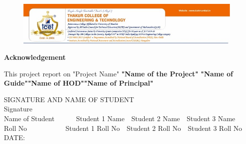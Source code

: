 \documentclass{book}
\begin{document}
\begin{figure}[h]
	\centering
	\includegraphics[scale=0.63]{tcet.jpg}
\end{figure}
\Huge
\textbf{Acknowledgement\\} 
\begin{doublespace}
	\Large
	This project report on "Project Name"  \textbf{"Name of the Project"} \textbf{"Name of Guide"}\textbf{"Name of HOD"}\textbf{"Name of Principal"}
\end{doublespace}
\tab\tab
\begin{doublespace}
	\normalsize
	\begin{flushleft}
		SIGNATURE AND NAME OF STUDENT\\

 Signature\\
 Name of Student \,\,\,\,\,\,\,\,\,\,\,\,\,\,\, Student 1 Name \,\, Student 2 Name \, \,Student 3 Name\\
 Roll No \,\,\,\,\,\,\,\,\,\,\,\,\,\,\,\,\,\,\,\,\,\,\,\,\,\,\,\,\,\, Student 1 Roll No \,\, Student 2 Roll No \, \,Student 3 Roll No\\
 \tab\tab\tab\tab
 DATE:
 	\end{flushleft}
 

\end{doublespace}
\end{document}
